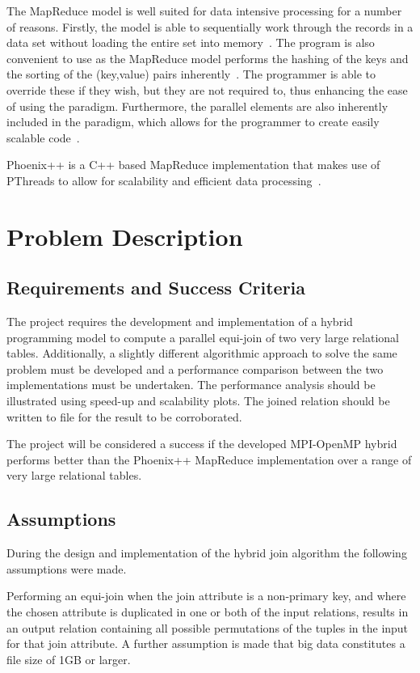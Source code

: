 \documentclass[11pt,twocolumn]{witseiepaper}
\begin{document}
The MapReduce model is well suited for data intensive processing for a number of reasons. Firstly, the model is able to sequentially work through the records in a data set without loading the entire set into memory~\cite{comparingMPIMapReduce}. The program is also convenient to use as the MapReduce model performs the hashing of the keys and the sorting of the (key,value) pairs inherently~\cite{phoenix}. The programmer is able to override these if they wish, but they are not required to, thus enhancing the ease of using the paradigm. Furthermore, the parallel elements are also inherently included in the paradigm, which allows for the programmer to create easily scalable code~\cite{comparingMPIMapReduce}. 

Phoenix++ is a C++ based MapReduce implementation that makes use of PThreads to allow for scalability and efficient data processing~\cite{phoenix}.

\section{Problem Description}

\subsection{Requirements and Success Criteria}

The project requires the development and implementation of a hybrid programming model to compute a parallel equi-join of two very large relational tables. Additionally, a slightly different algorithmic approach to solve the same problem must be developed and a performance comparison between the two implementations must be undertaken. The performance analysis should be illustrated using speed-up and scalability plots. The joined relation should be written to file for the result to be corroborated.

The project will be considered a success if the developed MPI-OpenMP hybrid performs better than the Phoenix++ MapReduce implementation over a range of very large relational tables. 

\subsection{Assumptions}

During the design and implementation of the hybrid join algorithm the following assumptions were made.  

Performing an equi-join when the join attribute is a non-primary key, and where the chosen attribute is duplicated in one or both of the input relations, results in an output relation containing all possible permutations of the tuples in the input for that join attribute. A further assumption is made that big data constitutes a file size of 1GB or larger. 
\end{document}
